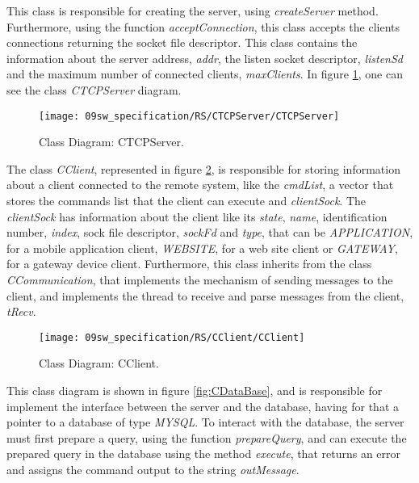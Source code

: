 
This class is responsible for creating the server, using \textit{createServer} method. Furthermore, using the function \textit{acceptConnection}, this class accepts the clients connections returning the socket file descriptor. This class contains the information about the server address, \textit{addr}, the listen socket descriptor, \textit{listenSd} and the maximum number of connected clients, \textit{maxClients}. In figure \ref{fig:CTCPServer}, one can see the class \textit{CTCPServer} diagram.

\begin{figure}[H]
	\centering
	\texttt{[image: 09sw\_specification/RS/CTCPServer/CTCPServer]}
	\caption{Class Diagram: CTCPServer.}
	\label{fig:CTCPServer}
\end{figure}


The class \textit{CClient}, represented in figure \ref{fig:CClient}, is responsible for storing information about a client connected to the remote system, like the \textit{cmdList}, a vector that stores the commands list that the client can execute and \textit{clientSock}. The \textit{clientSock} has information about the client like its \textit{state}, \textit{name}, identification number, \textit{index}, sock file descriptor, \textit{sockFd} and \textit{type}, that can be \textit{APPLICATION}, for a mobile application client, \textit{WEBSITE}, for a web site client or \textit{GATEWAY}, for a gateway device client. Furthermore, this class inherits from the class \textit{CCommunication}, that implements the mechanism of sending messages to the client, and implements the thread to receive and parse messages from the client, \textit{tRecv}. 

\begin{figure}[H]
	\centering
	\texttt{[image: 09sw\_specification/RS/CClient/CClient]}
	\caption{Class Diagram: CClient.}
	\label{fig:CClient}
\end{figure}


This class diagram is shown in figure \ref{fig:CDataBase}, and is responsible for implement the interface between the server and the database, having for that a pointer to a database of type \textit{MYSQL}. To interact with the database, the server must first prepare a query, using the function \textit{prepareQuery}, and can execute the prepared query in the database using the method \textit{execute}, that returns an error and assigns the command output to the string \textit{outMessage}.

